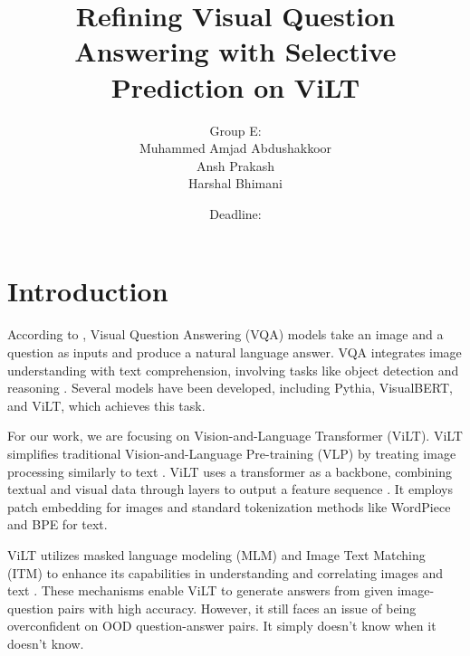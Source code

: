 \documentclass[
	english,
	accentcolor=8b,
	type=intern,
	marginpar=false
	]{tudapub}
\begin{document}
\title{Refining Visual Question Answering with Selective Prediction on ViLT\\
}
\author{
Group E:\\
Muhammed Amjad Abdushakkoor\\
Ansh Prakash\\
Harshal Bhimani\\
}
\date{Deadline: }

\maketitle

\section{Introduction}
According to \cite{agrawal2016vqavisualquestionanswering}, Visual Question Answering (VQA) models take an image and a question as inputs and produce a natural language answer. VQA integrates image understanding with text comprehension, involving tasks like object detection and reasoning \cite{agrawal2016vqavisualquestionanswering}. Several models have been developed, including Pythia, VisualBERT, and ViLT, which achieves this task.

For our work, we are focusing on Vision-and-Language Transformer (ViLT).
ViLT simplifies traditional Vision-and-Language Pre-training (VLP) by treating image processing similarly to text \cite{kim2021viltvisionandlanguagetransformerconvolution}. ViLT uses a transformer as a backbone, combining textual and visual data through layers to output a feature sequence \cite{kim2021viltvisionandlanguagetransformerconvolution}. It employs patch embedding for images and standard tokenization methods like WordPiece and BPE for text.

ViLT utilizes masked language modeling (MLM) and Image Text Matching (ITM) to enhance its capabilities in understanding and correlating images and text \cite{kim2021viltvisionandlanguagetransformerconvolution}. These mechanisms enable ViLT to generate answers from given image-question pairs with high accuracy.
However, it still faces an issue of being overconfident on OOD question-answer pairs. It simply doesn't know when it doesn't know.
\end{document}
